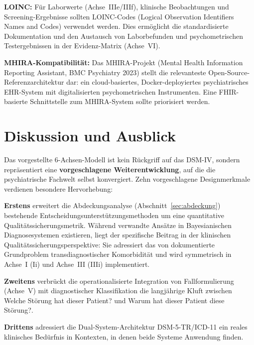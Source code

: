 \documentclass[11pt,a4paper]{article}
\begin{document}
\textbf{LOINC:} F\"ur Laborwerte (Achse~IIIe/IIIf), klinische Beobachtungen und Screening-Ergebnisse sollten LOINC-Codes (Logical Observation Identifiers Names and Codes) verwendet werden. Dies erm\"oglicht die standardisierte Dokumentation und den Austausch von Laborbefunden und psychometrischen Testergebnissen in der Evidenz-Matrix (Achse~VI).

\textbf{MHIRA-Kompatibilit\"at:} Das MHIRA-Projekt (Mental Health Information Reporting Assistant, BMC Psychiatry 2023) stellt die relevanteste Open-Source-Referenzarchitektur dar: ein cloud-basiertes, Docker-deployiertes psychiatrisches EHR-System mit digitalisierten psychometrischen Instrumenten. Eine FHIR-basierte Schnittstelle zum MHIRA-System sollte priorisiert werden.


\section{Diskussion und Ausblick}
\label{sec:diskussion}

Das vorgestellte 6-Achsen-Modell ist kein R\"uckgriff auf das DSM-IV, sondern repr\"asentiert eine \textbf{vorgeschlagene Weiterentwicklung}, auf die die psychiatrische Fachwelt selbst konvergiert. Zehn vorgeschlagene Designmerkmale verdienen besondere Hervorhebung:

\textbf{Erstens} erweitert die Abdeckungsanalyse (Abschnitt~\ref{sec:abdeckung}) bestehende Entscheidungsunterst\"utzungsmethoden um eine quantitative Qualit\"atssicherungsmetrik. W\"ahrend verwandte Ans\"atze in Bayesianischen Diagnosesystemen existieren, liegt der spezifische Beitrag in der klinischen Qualit\"atssicherungsperspektive: Sie adressiert das von \citet{PlanaRipoll2019} dokumentierte Grundproblem transdiagnostischer Komorbidit\"at und wird symmetrisch in Achse~I (Ii) und Achse~III (IIIi) implementiert.

\textbf{Zweitens} verbr\"uckt die operationalisierte Integration von Fallformulierung (Achse~V) mit diagnostischer Klassifikation die langj\"ahrige Kluft zwischen \glqq Welche St\"orung hat dieser Patient?\grqq{} und \glqq Warum hat dieser Patient diese St\"orung?\grqq{}.

\textbf{Drittens} adressiert die Dual-System-Architektur DSM-5-TR/ICD-11 ein reales klinisches Bed\"urfnis in Kontexten, in denen beide Systeme Anwendung finden.
\end{document}
